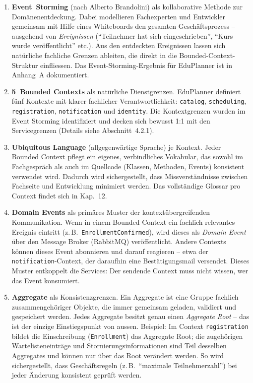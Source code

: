 \begin{enumerate}[leftmargin=2em]

  \item \textbf{Event~Storming} (nach Alberto Brandolini) als
  kollaborative Methode zur Domänenentdeckung.
  Dabei modellieren Fachexperten und Entwickler gemeinsam
  mit Hilfe eines Whiteboards den gesamten Geschäftsprozess -- ausgehend
  von \emph{Ereignissen} (``Teilnehmer hat sich
  eingeschrieben'', ``Kurs wurde veröffentlicht'' etc.).
  Aus den entdeckten Ereignissen lassen sich natürliche
  fachliche Grenzen ableiten, die direkt in die
  Bounded-Context-Struktur einfliessen.
  Das Event-Storming-Ergebnis für EduPlanner ist in
  Anhang~A dokumentiert.

  \item \textbf{5~Bounded Contexts} als natürliche Dienstgrenzen.
  EduPlanner definiert fünf Kontexte mit klarer fachlicher
  Verantwortlichkeit: \texttt{catalog},
  \texttt{scheduling}, \texttt{registration},
  \texttt{notification} und \texttt{identity}.
  Die Kontextgrenzen wurden im Event Storming identifiziert
  und decken sich bewusst 1:1 mit den Servicegrenzen
  (Details siehe Abschnitt~4.2.1).

  \item \textbf{Ubiquitous Language} (allgegenwärtige Sprache)
  je Kontext. Jeder Bounded Context pflegt ein eigenes,
  verbindliches Vokabular, das sowohl im Fachgespräch als
  auch im Quellcode (Klassen, Methoden, Events) konsistent
  verwendet wird. Dadurch wird sichergestellt, dass
  Missverständnisse zwischen Fachseite und Entwicklung
  minimiert werden. Das vollständige Glossar pro Context
  findet sich in Kap.~12.

  \item \textbf{Domain Events} als primäres Muster der
  kontextübergreifenden Kommunikation.
  Wenn in einem Bounded Context ein fachlich relevantes
  Ereignis eintritt (z.\,B.\
  \texttt{EnrollmentConfirmed}), wird dieses als
  \emph{Domain Event} über den Message Broker
  (RabbitMQ) veröffentlicht. Andere Contexts können
  dieses Event abonnieren und darauf reagieren -- etwa
  der \texttt{notification}-Context, der daraufhin eine
  Bestätigungsmail versendet. Dieses Muster entkoppelt
  die Services: Der sendende Context muss nicht wissen,
  wer das Event konsumiert.

  \item \textbf{Aggregate} als Konsistenzgrenzen.
  Ein Aggregate ist eine Gruppe fachlich zusammengehöriger
  Objekte, die immer gemeinsam geladen, validiert und
  gespeichert werden. Jedes Aggregate besitzt genau einen
  \emph{Aggregate Root} -- das ist der einzige
  Einstiegspunkt von aussen. Beispiel: Im Context
  \texttt{registration} bildet die Einschreibung
  (\texttt{Enrollment}) das Aggregate Root; die
  zugehörigen Wartelisteneinträge und
  Stornierungsinformationen sind Teil desselben
  Aggregates und können nur über das Root verändert
  werden. So wird sichergestellt, dass Geschäftsregeln
  (z.\,B.\ ``maximale Teilnehmerzahl'') bei jeder
  Änderung konsistent geprüft werden.

\end{enumerate}

